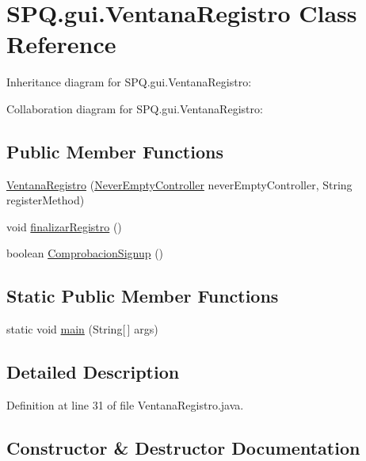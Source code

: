 \hypertarget{class_s_p_q_1_1gui_1_1_ventana_registro}{}\section{S\+P\+Q.\+gui.\+Ventana\+Registro Class Reference}
\label{class_s_p_q_1_1gui_1_1_ventana_registro}


Inheritance diagram for S\+P\+Q.\+gui.\+Ventana\+Registro\+:


Collaboration diagram for S\+P\+Q.\+gui.\+Ventana\+Registro\+:
\subsection*{Public Member Functions}
\begin{DoxyCompactItemize}
\item 
\mbox{\hyperlink{class_s_p_q_1_1gui_1_1_ventana_registro_a40069db92c94222331b181f23744c14f}{Ventana\+Registro}} (\mbox{\hyperlink{class_s_p_q_1_1controller_1_1_never_empty_controller}{Never\+Empty\+Controller}} never\+Empty\+Controller, String register\+Method)
\item 
void \mbox{\hyperlink{class_s_p_q_1_1gui_1_1_ventana_registro_ac33d30ad4e6980a453a3a6c3de20f468}{finalizar\+Registro}} ()
\item 
boolean \mbox{\hyperlink{class_s_p_q_1_1gui_1_1_ventana_registro_a409053f213651ce392699ee8c4f07e66}{Comprobacion\+Signup}} ()
\end{DoxyCompactItemize}
\subsection*{Static Public Member Functions}
\begin{DoxyCompactItemize}
\item 
static void \mbox{\hyperlink{class_s_p_q_1_1gui_1_1_ventana_registro_a8d80a5efba104ecaefab065592e23a68}{main}} (String\mbox{[}$\,$\mbox{]} args)
\end{DoxyCompactItemize}


\subsection{Detailed Description}


Definition at line 31 of file Ventana\+Registro.\+java.



\subsection{Constructor \& Destructor Documentation}
\mbox{\label{class_s_p_q_1_1gui_1_1_ventana_registro_a40069db92c94222331b181f23744c14f}} 
